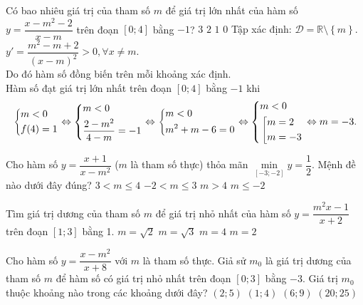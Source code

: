 \begin{ex}%
	Có bao nhiêu giá trị của tham số $m$ để giá trị lớn nhất của hàm số $y=\dfrac{x-m^2-2}{x-m}$ trên đoạn $[0;4]$ bằng $-1$?
	\choice
	{$3$}
	{$2$}
	{\True $1$}
	{$0$}
	\loigiai
	{Tập xác định: $\mathscr{D}=\mathbb{R}\setminus \left\lbrace m\right\rbrace $.\\
	$y'=\dfrac{m^2-m+2}{(x-m)^2}>0,\forall x\neq m$.\\
	Do đó hàm số đồng biến trên mỗi khoảng xác định.\\
	Hàm số đạt giá trị lớn nhất trên đoạn $[0;4]$ bằng $-1$ khi 
	$$\left\{\begin{aligned}&m < 0\\&f(4) = 1\end{aligned}\right. \Leftrightarrow \left\{\begin{aligned}&m<0\\&\dfrac{2-m^2}{4-m}=-1\end{aligned}\right. \Leftrightarrow \left\{\begin{aligned}&m<0\\&m^2+m-6=0\end{aligned}\right. \Leftrightarrow \left\{\begin{aligned}&m < 0\\&\left[\begin{aligned}&m = 2 \\&m = -3\end{aligned}\right.\end{aligned}\right. \Leftrightarrow m = -3.$$
}
\end{ex}
\begin{ex}%
	Cho hàm số $y=\dfrac{x+1}{x-m^2}$ ($m$ là tham số thực) thỏa mãn $\min\limits_{[-3;-2]} y=\dfrac{1}{2}$. Mệnh đề nào dưới đây đúng?
	\choice
	{$3<m\leq 4$}
	{\True $-2<m\leq 3$}
	{$m>4$}
	{$m\leq -2$}
\end{ex}
\begin{ex}%
	Tìm giá trị dương của tham số $m$ để giá trị nhỏ nhất của hàm số $y=\dfrac{m^2x-1}{x+2}$ trên đoạn $[1;3]$ bằng 1.
	\choice
	{\True $m=\sqrt{2}$}
	{$m=\sqrt{3}$}
	{$m=4$}
	{$m=2$}
\end{ex}
\begin{ex}%
	Cho hàm số $y=\dfrac{x-m^2}{x+8}$ với $m$ là tham số thực. Giả sử $m_0$ là giá trị dương của tham số $m$ để hàm số có giá trị nhỏ nhất trên đoạn $[0;3]$ bằng $-3$. Giá trị $m_0$ thuộc khoảng nào trong các khoảng dưới đây?
	\choice
	{$(2;5)$}
	{$(1;4)$}
	{$(6;9)$}
	{$(20;25)$}
\end{ex}
